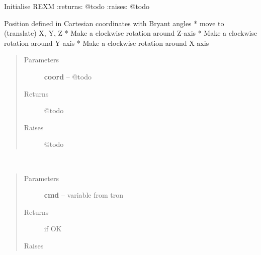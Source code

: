 \documentclass[letterpaper,10pt,english]{sphinxmanual}
\begin{document}
\begin{fulllineitems}
\begin{fulllineitems}
\end{fulllineitems}


\begin{fulllineitems}
\label{enuActor.Devices:enuActor.Devices.rexm.Rexm.initialise}
Initialise REXM
:returns: @todo
:raises: @todo

\end{fulllineitems}


\begin{fulllineitems}
\label{enuActor.Devices:enuActor.Devices.rexm.Rexm.move}
Position defined in Cartesian coordinates with Bryant angles
* move to (translate) X, Y, Z
* Make a clockwise rotation around Z-axis
* Make a clockwise rotation around Y-axis
* Make a clockwise rotation around X-axis
\begin{quote}\begin{description}
\item[{Parameters}] \leavevmode
\textbf{coord} -- @todo

\item[{Returns}] \leavevmode
@todo

\item[{Raises}] \leavevmode
@todo

\end{description}\end{quote}

\end{fulllineitems}


\begin{fulllineitems}
\label{enuActor.Devices:enuActor.Devices.rexm.Rexm.start_communication}~\begin{quote}\begin{description}
\item[{Parameters}] \leavevmode
\textbf{cmd} -- variable from tron

\item[{Returns}]  if OK

\item[{Raises}] \leavevmode
{\hyperref[enuActor.Devices:enuActor.Devices.Error.CommErr]{}}

\end{description}\end{quote}

\end{fulllineitems}


\end{fulllineitems}
\end{document}
